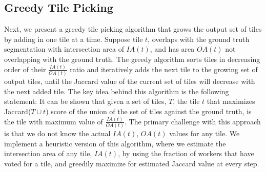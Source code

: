 \subsection{Greedy Tile Picking}
Next, we present a greedy tile picking algorithm that grows the output set of tiles by adding in one tile at a time. Suppose tile $t$, overlaps with the ground truth segmentation with intersection area of $IA(t)$, and has area $OA(t)$ not overlapping with the ground truth. The greedy algorithm sorts tiles in decreasing order of their $\frac{IA(t)}{OA(t)}$ ratio and iteratively adds the next tile to the growing set of output tiles, until the Jaccard value of the current set of tiles will decrease with the next added tile.  The key idea behind this algorithm is the following statement: It can be shown that given a set of tiles, $T$, the tile $t$ that maximizes Jaccard($T\cup t$) score of the union of the set of tiles against the ground truth, is the tile with maximum value of $\frac{IA(t)}{OA(t)}$. The primary challenge with this approach is that we do not know the actual $IA(t)$, $OA(t)$ values for any tile. We implement a heuristic version of this algorithm, where we estimate the intersection area of any tile, $IA(t)$, by using the fraction of workers that have voted for a tile, and greedily maximize for estimated Jaccard value at every step. 


